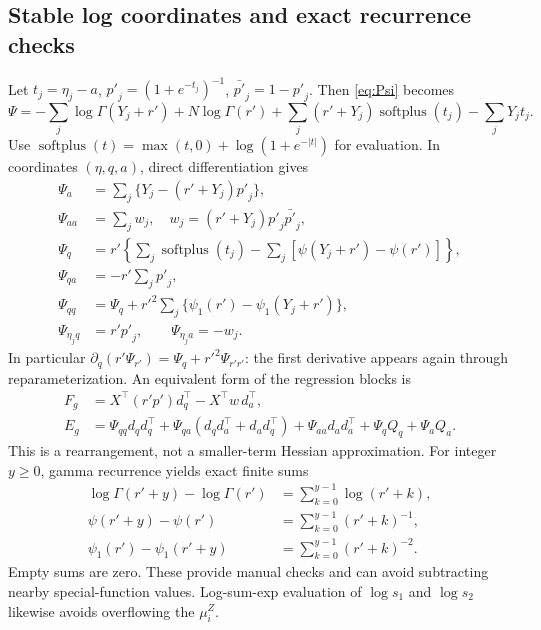 \documentclass[11pt,a4paper]{article}
\newcommand{\softplus}{\operatorname{softplus}}
\numberwithin{equation}{section}
\begin{document}
\subsection{Stable log coordinates and exact recurrence checks}
Let $t_j=\eta_j-a$, ${p'}_j=(1+e^{-t_j})^{-1}$,
$\bar {p'}_j=1-{p'}_j$. Then \eqref{eq:Psi} becomes
\begin{equation}
 \Psi=-\sum_j\log\Gamma(Y_j+{r'})+N\log\Gamma({r'})
       +\sum_j({r'}+Y_j)\softplus(t_j)-\sum_jY_jt_j .
\end{equation}
Use $\softplus(t)=\max(t,0)+\log(1+e^{-|t|})$ for evaluation.
In coordinates $(\eta,q,a)$, direct differentiation gives
\begin{align}
 \Psi_a&=\sum_j\{Y_j-({r'}+Y_j){p'}_j\},\\
 \Psi_{aa}&=\sum_jw_j,\quad w_j=({r'}+Y_j){p'}_j\bar {p'}_j,\\
 \Psi_q&={r'}\left\{\sum_j\softplus(t_j)
                  -\sum_j[\psi(Y_j+{r'})-\psi({r'})]\right\},\\
 \Psi_{qa}&=-{r'}\sum_j{p'}_j,\\
 \Psi_{qq}&=\Psi_q+{r'}^2\sum_j\{\psi_1({r'})-\psi_1(Y_j+{r'})\},\\
 \Psi_{\eta_jq}&={r'} {p'}_j,\qquad\Psi_{\eta_ja}=-w_j .
\end{align}
In particular $\partial_q({r'}\Psi_{r'})=\Psi_q+{r'}^2\Psi_{{r'}{r'}}$:
the first derivative appears again through reparameterization.
An equivalent form of the regression blocks is
\begin{align}
 F_g&=X^\top({r'}p')d_q^\top-X^\top w\,d_a^\top,\\
 E_g&=\Psi_{qq}d_qd_q^\top+
       \Psi_{qa}(d_qd_a^\top+d_ad_q^\top)+\Psi_{aa}d_ad_a^\top
       +\Psi_qQ_q+\Psi_aQ_a . \label{eq:log-composition}
\end{align}
This is a rearrangement, not a smaller-term Hessian approximation.
For integer $y\geq0$, gamma recurrence yields exact finite sums
\begin{align}
 \log\Gamma({r'}+y)-\log\Gamma({r'})&=\sum_{k=0}^{y-1}\log({r'}+k),\\
 \psi({r'}+y)-\psi({r'})&=\sum_{k=0}^{y-1}({r'}+k)^{-1},\\
 \psi_1({r'})-\psi_1({r'}+y)&=\sum_{k=0}^{y-1}({r'}+k)^{-2}.
\end{align}
Empty sums are zero. These provide manual checks and can avoid subtracting
nearby special-function values. Log-sum-exp evaluation of
$\log s_1$ and $\log s_2$ likewise avoids overflowing the $\mu_i^Z$.
\end{document}

